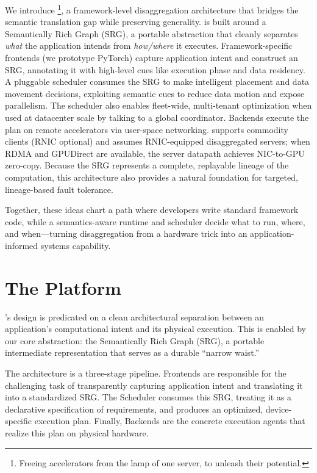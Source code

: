 We introduce \sys\footnote{Freeing accelerators from the lamp of one server, to unleash their potential.}, 
a framework-level disaggregation architecture that bridges the semantic translation gap while preserving generality.
\sys is built around a Semantically Rich Graph (SRG), a portable abstraction that cleanly separates \emph{what} the application intends from \emph{how/where} it executes.
Framework-specific frontends (we prototype PyTorch) capture application intent and construct an SRG,
annotating it with high-level cues like execution phase and data residency.
A pluggable scheduler consumes the SRG to make intelligent placement and data movement decisions, exploiting semantic cues to reduce data motion and expose parallelism.
The scheduler also enables fleet-wide, multi-tenant optimization when used at datacenter scale by talking to a global coordinator.
Backends execute the plan on remote accelerators via user-space networking. 
\sys supports commodity clients (RNIC optional) and assumes RNIC-equipped disaggregated servers; when RDMA and GPUDirect are available, the server datapath achieves NIC-to-GPU zero-copy.
Because the SRG represents a complete, replayable lineage of the computation, this architecture also provides a natural foundation for targeted, lineage-based fault tolerance.

Together, these ideas chart a path where developers write standard framework code, while a semantics-aware runtime and scheduler decide what to run, where, and when---turning disaggregation from a hardware trick into an application-informed systems capability.
\section{The \sys Platform}
\label{sec:framework}

\sys's design is predicated on a clean architectural separation between an application's computational intent and its physical execution. 
This is enabled by our core abstraction: the Semantically Rich Graph (SRG), a portable intermediate representation that serves as a durable ``narrow waist.''

The architecture is a three-stage pipeline. 
Frontends are responsible for the challenging task of transparently capturing application intent and translating it into a standardized SRG. 
The Scheduler consumes this SRG, treating it as a declarative specification of requirements, and produces an optimized, device-specific execution plan. 
Finally, Backends are the concrete execution agents that realize this plan on physical hardware.

